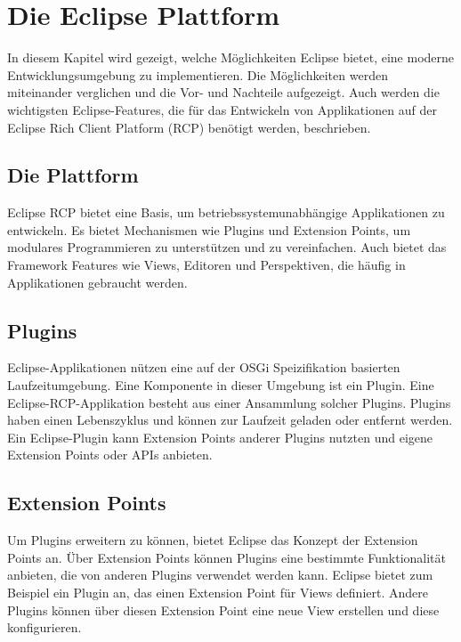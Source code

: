 \chapter{Die Eclipse Plattform}
\label{chap:platform}

In diesem Kapitel wird gezeigt, welche Möglichkeiten Eclipse bietet, eine moderne Entwicklungsumgebung zu implementieren. Die Möglichkeiten werden miteinander verglichen und die Vor- und Nachteile aufgezeigt. Auch werden die wichtigsten Eclipse-Features, die für das Entwickeln von Applikationen auf der Eclipse Rich Client Platform (RCP) benötigt werden, beschrieben.

\section{Die Plattform}

Eclipse RCP bietet eine Basis, um betriebssystemunabhängige Applikationen zu entwickeln. Es bietet Mechanismen wie Plugins und Extension Points, um modulares Programmieren zu unterstützen und zu vereinfachen. Auch bietet das Framework Features wie Views, Editoren und Perspektiven, die häufig in Applikationen gebraucht werden.

\section{Plugins}

Eclipse-Applikationen nützen eine auf der OSGi Speizifikation basierten Laufzeitumgebung. Eine Komponente in dieser Umgebung ist ein Plugin. Eine Eclipse-RCP-Applikation besteht aus einer Ansammlung solcher Plugins.\cite{whatisaplugin} Plugins haben einen Lebenszyklus und können zur Laufzeit geladen oder entfernt werden. Ein Eclipse-Plugin kann Extension Points anderer Plugins nutzten und eigene Extension Points oder APIs anbieten.

\section{Extension Points}
\label{extensionpointssection}

Um Plugins erweitern zu können, bietet Eclipse das Konzept der Extension Points an. Über Extension Points können Plugins eine bestimmte Funktionalität anbieten, die von anderen Plugins verwendet werden kann. 
\newline
Eclipse bietet zum Beispiel ein Plugin an, das einen Extension Point für Views definiert. Andere Plugins können über diesen Extension Point eine neue View erstellen und diese konfigurieren. \cite{extensionpoints}

